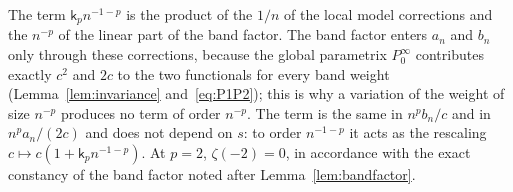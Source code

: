 \begin{remark}\label{rem:plt1-scales}
The term $\mathsf k_pn^{-1-p}$ is the product of the $1/n$ of the local model corrections and the $n^{-p}$ of the linear
part of the band factor. The band factor enters $a_n$ and $b_n$ only through these corrections, because the global
parametrix $P^\infty_0$ contributes exactly $c^2$ and $2c$ to the two functionals for every band weight
(Lemma~\ref{lem:invariance} and~\eqref{eq:P1P2}); this is why a variation of the weight of size $n^{-p}$ produces no term
of order $n^{-p}$. The term is the same in $n^pb_n/c$ and in $n^pa_n/(2c)$ and does not depend on $s$: to order
$n^{-1-p}$ it acts as the rescaling $c\mapsto c(1+\mathsf k_pn^{-1-p})$. At $p=2$, $\zeta(-2)=0$, in accordance with the
exact constancy of the band factor noted after Lemma~\ref{lem:bandfactor}.
\end{remark}
